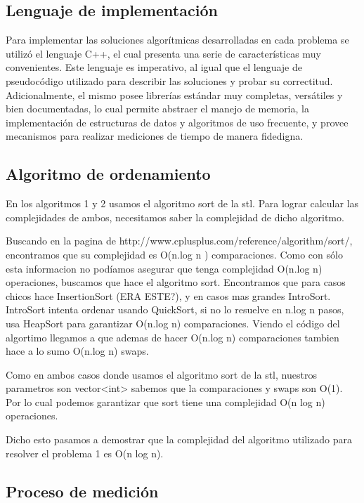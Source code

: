 \subsection{Lenguaje de implementación}

Para implementar las soluciones algorítmicas desarrolladas en cada problema se utilizó el lenguaje C++, el cual presenta una serie de características muy convenientes. Este lenguaje es imperativo, al igual que el lenguaje de pseudocódigo utilizado para describir las soluciones y probar su correctitud. Adicionalmente, el mismo posee librerías estándar muy completas, versátiles y bien documentadas, lo cual permite abstraer el manejo de memoria, la implementación de estructuras de datos y algoritmos de uso frecuente, y provee mecanismos para realizar mediciones de tiempo de manera fidedigna.

\subsection{Algoritmo de ordenamiento}

En los algoritmos 1 y 2 usamos el algoritmo sort de la stl. Para lograr calcular las complejidades de ambos, necesitamos saber la complejidad de dicho algoritmo.

Buscando en la pagina de http://www.cplusplus.com/reference/algorithm/sort/, encontramos que su complejidad es O(n.log n ) comparaciones. Como con sólo esta informacion no podíamos asegurar que tenga complejidad O(n.log n) operaciones, buscamos que hace el algoritmo sort. Encontramos que para casos chicos hace InsertionSort (ERA ESTE?), y en casos mas grandes IntroSort. IntroSort intenta ordenar usando QuickSort, si no lo resuelve en n.log n pasos, usa HeapSort para garantizar O(n.log n) comparaciones. Viendo el código del algortimo llegamos a que ademas de hacer O(n.log n) comparaciones tambien hace a lo sumo O(n.log n) swaps.

Como en ambos casos donde usamos el algoritmo sort de la stl, nuestros parametros son vector<int> sabemos que la comparaciones y swaps son O(1). Por lo cual podemos garantizar que sort tiene una complejidad O(n log n) operaciones.

Dicho esto pasamos a demostrar que la complejidad del algoritmo utilizado para resolver el problema 1 es O(n log n).

\subsection{Proceso de medición}

